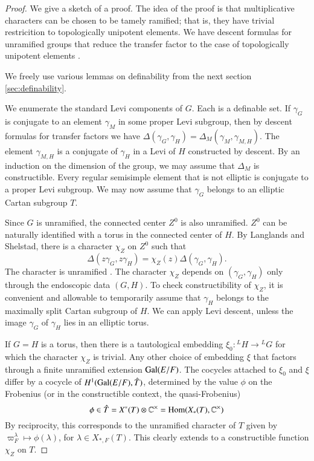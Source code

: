 \begin{proof}  We give a sketch of a proof.  
The idea of the proof is that multiplicative characters can be chosen to be tamely ramified; that is, they have trivial restricition to topologically unipotent elements.
We have descent formulas for unramified groups that reduce the transfer factor to the case of topologically unipotent elements \cite{langlands2007descent} \cite{hales1993simple}.

We freely use various lemmas on definability from the next section \ref{sec:definability}.

We enumerate the standard Levi components of $G$.  Each is a definable set.  If $\gamma_G$ is conjugate to an element $\gamma_M$ in some proper Levi subgroup, then
by descent formulas for transfer factors we have $\Delta(\gamma_G,\gamma_H) = \Delta_M(\gamma_M,\gamma_{M,H})$.   The element $\gamma_{M,H}$ is a conjugate
of $\gamma_H$ in a Levi of $H$ constructed by descent.
By an induction on the dimension of the group, we may assume that $\Delta_M$ is constructible.  Every regular semisimple element that is not
elliptic is conjugate to a proper Levi subgroup.  We may now assume that $\gamma_G$ belongs to an elliptic Cartan subgroup $T$.

Since $G$ is unramified, the connected center $Z^0$ is also unramified.
$Z^0$ can be naturally identified with a torus in the connected center of $H$.
By Langlands and Shelstad, there is a character $\chi_Z$ on $Z^0$ such that
\[
\Delta(z\gamma_G,z\gamma_H) = \chi_Z(z)\Delta(\gamma_G,\gamma_H).
\]
The character is unramified \cite{hales1993simple}.
The character $\chi_Z$ depends on $(\gamma_G,\gamma_H)$ only through the endoscopic data $(G,H)$.
To check constructibility of $\chi_Z$, it is convenient and allowable to temporarily assume that $\gamma_H$ belongs to the maximally split Cartan subgroup of $H$.
We can apply Levi descent, unless the image $\gamma_G$ of $\gamma_H$ lies in an elliptic torus.

If $G=H$ is a torus, then there is a tautological embedding $\xi_0:{}^LH \to {}^LG$ for which the character $\chi_Z$ is trivial.  Any other choice
of embedding $\xi$ that factors through a finite unramified extension ${\operatorname{Gal}}(E/F)$.  The cocycles attached to $\xi_0$ and $\xi$ 
differ by a cocycle of $H^1({\operatorname{Gal}}(E/F),\hat T)$,
determined by the value $\phi$ on the Frobenius (or in the constructible context, the quasi-Frobenius)
\[
\phi \in \hat T = X^*(T)\otimes \mathbb{C}^\times = {\operatorname{Hom}}(X_*(T),\mathbb{C}^\times)
\]
By reciprocity, this corresponds to the unramified character of $T$ given by $\varpi_F^\lambda\mapsto \phi(\lambda)$, for $\lambda\in X_{*,F}(T)$.
This clearly extends to a constructible function $\chi_Z$ on $T$.


\end{proof}
